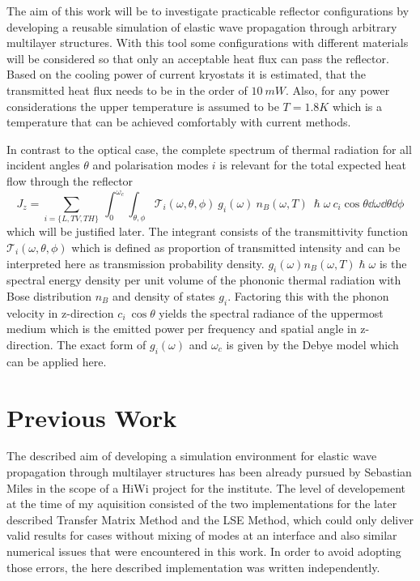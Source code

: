 The aim of this work will be to investigate practicable reflector
configurations by developing a reusable simulation of elastic wave propagation
through arbitrary multilayer structures. With this tool some configurations
with different materials will be considered so that only an acceptable heat
flux can pass the reflector. %
Based on the cooling power of current kryostats it is estimated, that the
transmitted heat flux needs to be in the order of $10\ \si{mW}$. Also,
for any power considerations the upper temperature is assumed to be
$T=1.8\si{K}$
which is a temperature that can be achieved comfortably with current methods.

In contrast to the optical case, the complete spectrum of thermal
radiation for all incident angles $\theta$ and polarisation modes $i$ is
relevant for the total expected heat flow through the reflector
\begin{equation} \label{eq:totalheatflow}
    J_z = \sum\limits_{i=\{L,TV,TH\}}\ \int_0^{\omega_c}\int_{\theta, \phi}
    \mathcal{T}_i(\omega, \theta, \phi)\ g_i(\omega)\ n_B(\omega, T)\
    \hslash \omega\  c_i\cos \theta \dd{\omega} \dd{\theta}\dd{\phi}
\end{equation}
which will be justified later. The integrant
consists of the transmittivity function $\mathcal{T}_i(\omega, \theta, \phi)$
which is defined as proportion of transmitted intensity and can be interpreted
here as transmission probability density. $g_i(\omega)
    n_B(\omega,T)\hslash\omega$ is the spectral energy density per unit volume
of the phononic thermal radiation with Bose distribution $n_B$ and density of
states $g_i$. Factoring this with the phonon velocity in z-direction $c_i\
    \cos\theta$ yields the spectral radiance of the uppermost medium which is
the emitted power per frequency and spatial angle in z-direction. The exact
form of $g_i(\omega)$ and $\omega_c$ is given by the Debye model which can be
applied here.

\section{Previous Work}
The described aim of developing a simulation environment for elastic wave
propagation through multilayer structures has been already pursued by Sebastian
Miles in the scope of a HiWi project for the institute. The level of
developement at the time of my aquisition consisted of the two
implementations for the later described Transfer Matrix Method and the LSE
Method, which could only deliver valid results for cases without mixing of
modes at an interface and also similar numerical issues that were encountered
in this work. In order to avoid adopting those errors, the here described
implementation was written independently.

